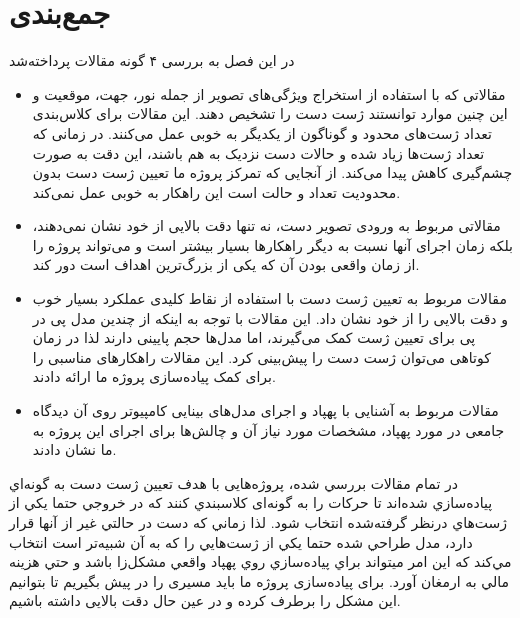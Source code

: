 \section{جمع‌بندی}

در این فصل به بررسی ۴ گونه مقالات پرداخته‌شد 
\begin{itemize}
    \item مقالاتی که با استفاده از استخراج ویژگی‌های تصویر از جمله نور، جهت، موقعیت و این چنین موارد توانستند ژست دست را تشخیص دهند. این مقالات برای کلاس‌بندی تعداد ژست‌های محدود و گوناگون از یکدیگر به خوبی عمل می‌کنند. در زمانی که تعداد ژست‌ها زیاد شده و حالات دست نزدیک به هم باشند، این دقت به صورت چشم‌گیری کاهش پیدا می‌کند. از آنجایی که تمرکز پروژه ما تعیین ژست دست بدون محدودیت تعداد و حالت است این راهکار به خوبی عمل نمی‌کند.
    \item مقالاتی مربوط به ورودی تصویر دست، نه تنها دقت بالایی از خود نشان نمی‌دهند، بلکه زمان اجرای آنها نسبت به دیگر راهکارها بسیار بیشتر است و می‌تواند پروژه را از زمان واقعی بودن آن که یکی از بزرگ‌ترین اهداف است دور کند.
    \item مقالات مربوط به تعیین ژست دست با استفاده از نقاط کلیدی عملکرد بسیار خوب و دقت بالایی را از خود نشان داد. این مقالات با توجه به اینکه از چندین مدل پی در پی برای تعیین ژست کمک می‌گیرند، اما مدل‌ها حجم پایینی دارند لذا در زمان کوتاهی می‌توان ژست دست را پیش‌بینی کرد. این مقالات راهکار‌های مناسبی را برای کمک پیاده‌سازی پروژه ما ارائه دادند.
    \item مقالات مربوط به آشنایی با پهپاد و اجرای مدل‌های بینایی کامپیوتر روی آن دیدگاه جامعی در مورد پهپاد، مشخصات مورد نیاز آن و چالش‌ها برای اجرای این پروژه به ما نشان دادند.
\end{itemize}

در تمام مقالات بررسي شده، پروژه‌هایی با هدف تعیین ژست دست به گونه‌اي پياده‌سازي شده‌اند تا حركات را به گونه‌ای كلاسبندي كنند كه در خروجي حتما يكي از ژست‌هاي درنظر گرفته‌شده انتخاب شود. لذا زماني كه دست در حالتي غير از آنها قرار دارد، مدل طراحي شده 
حتما يكي از ژست‌هايي را كه به آن شبيه‌تر است انتخاب مي‌كند كه اين امر ميتواند براي پياده‌سازي روي پهپاد واقعي مشكل‌زا باشد و حتي هزينه مالي به ارمغان آورد. برای پیاده‌سازی پروژه ما باید مسیری را در پیش بگیریم تا بتوانیم این مشکل را برطرف کرده و در عین حال دقت بالایی داشته باشیم.